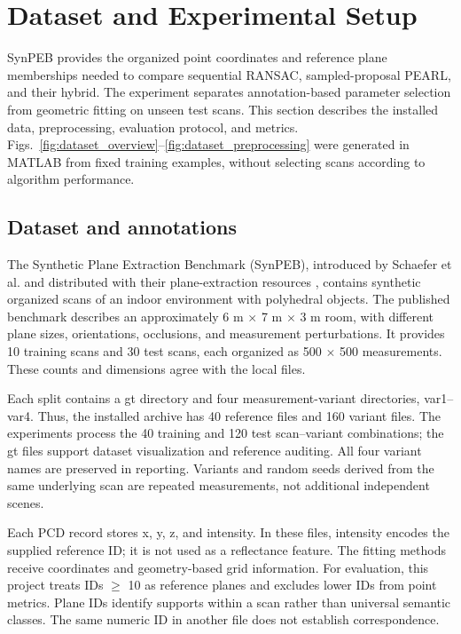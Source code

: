\section{Dataset and Experimental Setup}\label{dataset-and-experimental-setup}

SynPEB provides the organized point coordinates and reference plane memberships needed to compare sequential RANSAC, sampled-proposal PEARL, and their hybrid. The experiment separates annotation-based parameter selection from geometric fitting on unseen test scans. This section describes the installed data, preprocessing, evaluation protocol, and metrics. Figs.~\ref{fig:dataset_overview}--\ref{fig:dataset_preprocessing} were generated in MATLAB from fixed training examples, without selecting scans according to algorithm performance.

\subsection{Dataset and annotations}\label{dataset-and-annotations}

The Synthetic Plane Extraction Benchmark (SynPEB), introduced by Schaefer et al. \cite{schaefer2019planes} and distributed with their plane-extraction resources \cite{ppeResources}, contains synthetic organized scans of an indoor environment with polyhedral objects. The published benchmark describes an approximately 6 m \(\times\) 7 m \(\times\) 3 m room, with different plane sizes, orientations, occlusions, and measurement perturbations. It provides 10 training scans and 30 test scans, each organized as 500 \(\times\) 500 measurements. These counts and dimensions agree with the local files.

Each split contains a gt directory and four measurement-variant directories, var1--var4. Thus, the installed archive has 40 reference files and 160 variant files. The experiments process the 40 training and 120 test scan--variant combinations; the gt files support dataset visualization and reference auditing. All four variant names are preserved in reporting. Variants and random seeds derived from the same underlying scan are repeated measurements, not additional independent scenes.

Each PCD record stores x, y, z, and intensity. In these files, intensity encodes the supplied reference ID; it is not used as a reflectance feature. The fitting methods receive coordinates and geometry-based grid information. For evaluation, this project treats IDs \(\geq\) 10 as reference planes and excludes lower IDs from point metrics. Plane IDs identify supports within a scan rather than universal semantic classes. The same numeric ID in another file does not establish correspondence.

